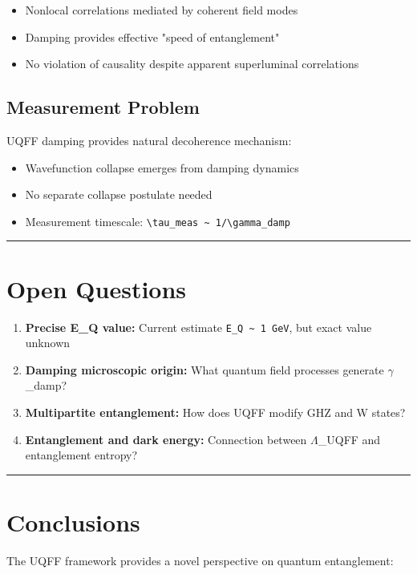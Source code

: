 \documentclass[12pt,a4paper]{article}
\begin{document}
\begin{itemize}
  \item Nonlocal correlations mediated by coherent field modes
  \item Damping provides effective "speed of entanglement"
  \item No violation of causality despite apparent superluminal correlations
\end{itemize}

\subsection{Measurement Problem}

UQFF damping provides natural decoherence mechanism:

\begin{itemize}
  \item Wavefunction collapse emerges from damping dynamics
  \item No separate collapse postulate needed
  \item Measurement timescale: \texttt{\textbackslash tau\_meas \textasciitilde{} 1/\textbackslash gamma\_damp}
\end{itemize}

\medskip\hrule\medskip

\section{Open Questions}

\begin{enumerate}
  \item \textbf{Precise E\_Q value:} Current estimate \texttt{E\_Q \textasciitilde{} 1 GeV}, but exact value unknown
  \item \textbf{Damping microscopic origin:} What quantum field processes generate $\gamma$\_damp?
  \item \textbf{Multipartite entanglement:} How does UQFF modify GHZ and W states?
  \item \textbf{Entanglement and dark energy:} Connection between $\Lambda$\_UQFF and entanglement entropy?
\end{enumerate}

\medskip\hrule\medskip

\section{Conclusions}

The UQFF framework provides a novel perspective on quantum entanglement:
\end{document}
